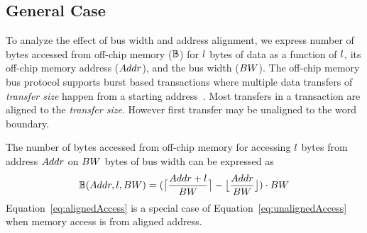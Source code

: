 \subsection{General Case}
To analyze the effect of bus width and address alignment, we express number of bytes accessed from off-chip memory ($\numBytesOffChip$) for $\dataLength$ bytes of data as a function of $\dataLength$, its off-chip memory address ($\addressSym$), and the bus width ($\busWidth$).
The off-chip memory bus protocol supports burst based transactions where multiple data transfers of \emph{transfer size} happen from a starting address~\cite{AxiProtocolSpec}. Most transfers in a transaction are aligned to the \emph{transfer size}. However first transfer may be unaligned to the word boundary. 

The number of bytes accessed from off-chip memory for accessing $\dataLength$ bytes from address $\addressSym$ on $\busWidth$ bytes of bus width can be expressed as
\begin{equation}\label{eq:unalignedAccess}
	\begin{aligned}
		\numBytesOffChip(\addressSym,\dataLength,\busWidth)=(\ceil[\big]{\frac{\addressSym+\dataLength}{\busWidth}}-\floor[\big]{\frac{\addressSym}{\busWidth}})\cdot{\busWidth}
	\end{aligned}
\end{equation}
Equation~\ref{eq:alignedAccess} is a special case of Equation~\ref{eq:unalignedAccess} when memory access is from aligned address.

